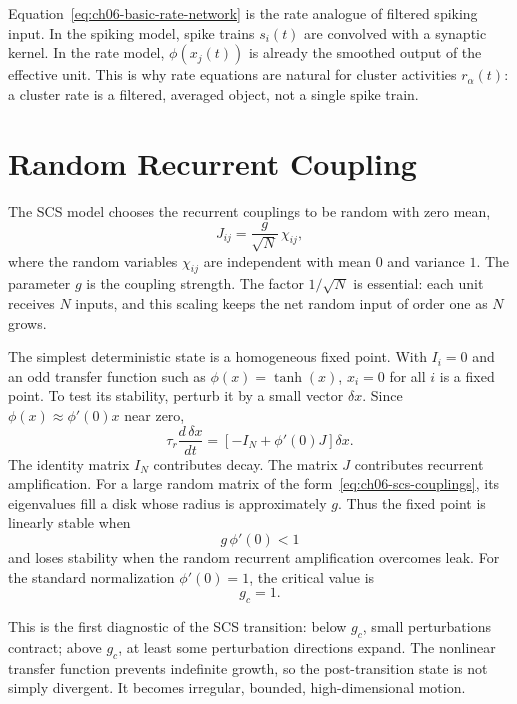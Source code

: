 Equation~\eqref{eq:ch06-basic-rate-network} is the rate analogue of filtered
spiking input. In the spiking model, spike trains \(s_i(t)\) are convolved with
a synaptic kernel. In the rate model, \(\phi(x_j(t))\) is already the smoothed
output of the effective unit. This is why rate equations are natural for cluster
activities \(r_\alpha(t)\): a cluster rate is a filtered, averaged object, not a
single spike train.

\section{Random Recurrent Coupling}
\label{sec:ch06-random-coupling}

The SCS model chooses the recurrent couplings to be random with zero mean,
\[
        J_{ij} = \frac{g}{\sqrt{N}}\,\chi_{ij},
        \label{eq:ch06-scs-couplings}
\]
where the random variables \(\chi_{ij}\) are independent with mean \(0\) and
variance \(1\). The parameter \(g\) is the coupling strength. The factor
\(1/\sqrt{N}\) is essential: each unit receives \(N\) inputs, and this scaling
keeps the net random input of order one as \(N\) grows.

The simplest deterministic state is a homogeneous fixed point. With \(I_i=0\)
and an odd transfer function such as \(\phi(x)=\tanh(x)\), \(x_i=0\) for all
\(i\) is a fixed point. To test its stability, perturb it by a small vector
\(\delta x\). Since \(\phi(x)\approx \phi'(0)x\) near zero,
\[
        \tau_r \frac{d\,\delta x}{dt}
        =
        \left[-I_N + \phi'(0)J\right]\delta x .
        \label{eq:ch06-linearized-rate}
\]
The identity matrix \(I_N\) contributes decay. The matrix \(J\) contributes
recurrent amplification. For a large random matrix of the
form~\eqref{eq:ch06-scs-couplings}, its eigenvalues fill a disk whose radius is
approximately \(g\). Thus the fixed point is linearly stable when
\[
        g\,\phi'(0) < 1
\]
and loses stability when the random recurrent amplification overcomes leak.
For the standard normalization \(\phi'(0)=1\), the critical value is
\[
        g_c = 1 .
        \label{eq:ch06-scs-critical-g}
\]

This is the first diagnostic of the SCS transition: below \(g_c\), small
perturbations contract; above \(g_c\), at least some perturbation directions
expand. The nonlinear transfer function prevents indefinite growth, so the
post-transition state is not simply divergent. It becomes irregular, bounded,
high-dimensional motion.

